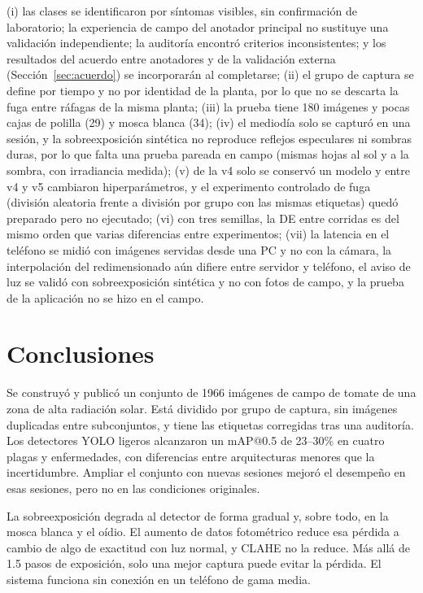 \documentclass[sensors,article,submit,pdftex,moreauthors]{Definitions/mdpi}
\begin{document}
{\color{blue} (i) las clases se identificaron por síntomas visibles, sin confirmación de laboratorio; la experiencia de campo del anotador principal no sustituye una validación independiente; la auditoría encontró criterios inconsistentes; y los resultados del acuerdo entre anotadores y de la validación externa (Sección~\ref{sec:acuerdo}) se incorporarán al completarse;} {\color{blue} (ii) el grupo de captura se define por tiempo y no por identidad de la planta, por lo que no se descarta la fuga entre ráfagas de la misma planta;} {\color{blue} (iii) la prueba tiene 180 imágenes y pocas cajas de polilla (29) y mosca blanca (34);} {\color{blue} (iv) el mediodía solo se capturó en una sesión, y la sobreexposición sintética no reproduce reflejos especulares ni sombras duras, por lo que falta una prueba pareada en campo (mismas hojas al sol y a la sombra, con irradiancia medida);} {\color{blue} (v) de la v4 solo se conservó un modelo y entre v4 y v5 cambiaron hiperparámetros, y el experimento controlado de fuga (división aleatoria frente a división por grupo con las mismas etiquetas) quedó preparado pero no ejecutado;} {\color{blue} (vi) con tres semillas, la DE entre corridas es del mismo orden que varias diferencias entre experimentos;} {\color{blue} (vii) la latencia en el teléfono se midió con imágenes servidas desde una PC y no con la cámara, la interpolación del redimensionado aún difiere entre servidor y teléfono, el aviso de luz se validó con sobreexposición sintética y no con fotos de campo, y la prueba de la aplicación no se hizo en el campo.}

\section{Conclusiones}

{\color{blue} Se construyó y publicó un conjunto de 1966 imágenes de campo de tomate de una zona de alta radiación solar.} {\color{blue} Está dividido por grupo de captura, sin imágenes duplicadas entre subconjuntos, y tiene las etiquetas corregidas tras una auditoría.} {\color{blue} Los detectores YOLO ligeros alcanzaron un mAP@0.5 de 23--30\% en cuatro plagas y enfermedades, con diferencias entre arquitecturas menores que la incertidumbre.} {\color{blue} Ampliar el conjunto con nuevas sesiones mejoró el desempeño en esas sesiones, pero no en las condiciones originales.}

{\color{blue} La sobreexposición degrada al detector de forma gradual y, sobre todo, en la mosca blanca y el oídio.} {\color{blue} El aumento de datos fotométrico reduce esa pérdida a cambio de algo de exactitud con luz normal, y CLAHE no la reduce.} {\color{blue} Más allá de 1.5 pasos de exposición, solo una mejor captura puede evitar la pérdida.} {\color{blue} El sistema funciona sin conexión en un teléfono de gama media.}
\end{document}
